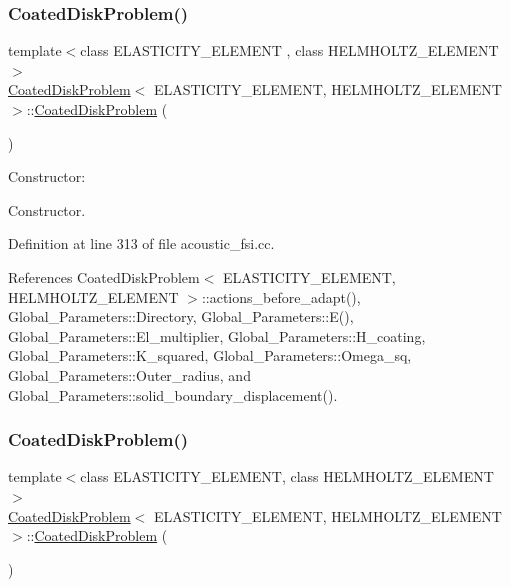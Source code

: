 \subsubsection{\texorpdfstring{Coated\+Disk\+Problem()}{CoatedDiskProblem()}\hspace{0.1cm}{\footnotesize\ttfamily [1/2]}}
{\footnotesize\ttfamily template$<$class E\+L\+A\+S\+T\+I\+C\+I\+T\+Y\+\_\+\+E\+L\+E\+M\+E\+NT , class H\+E\+L\+M\+H\+O\+L\+T\+Z\+\_\+\+E\+L\+E\+M\+E\+NT $>$ \\
\hyperlink{classCoatedDiskProblem}{Coated\+Disk\+Problem}$<$ E\+L\+A\+S\+T\+I\+C\+I\+T\+Y\+\_\+\+E\+L\+E\+M\+E\+NT, H\+E\+L\+M\+H\+O\+L\+T\+Z\+\_\+\+E\+L\+E\+M\+E\+NT $>$\+::\hyperlink{classCoatedDiskProblem}{Coated\+Disk\+Problem} (\begin{DoxyParamCaption}{ }\end{DoxyParamCaption})}



Constructor\+: 

Constructor. 

Definition at line 313 of file acoustic\+\_\+fsi.\+cc.



References Coated\+Disk\+Problem$<$ E\+L\+A\+S\+T\+I\+C\+I\+T\+Y\+\_\+\+E\+L\+E\+M\+E\+N\+T, H\+E\+L\+M\+H\+O\+L\+T\+Z\+\_\+\+E\+L\+E\+M\+E\+N\+T $>$\+::actions\+\_\+before\+\_\+adapt(), Global\+\_\+\+Parameters\+::\+Directory, Global\+\_\+\+Parameters\+::\+E(), Global\+\_\+\+Parameters\+::\+El\+\_\+multiplier, Global\+\_\+\+Parameters\+::\+H\+\_\+coating, Global\+\_\+\+Parameters\+::\+K\+\_\+squared, Global\+\_\+\+Parameters\+::\+Omega\+\_\+sq, Global\+\_\+\+Parameters\+::\+Outer\+\_\+radius, and Global\+\_\+\+Parameters\+::solid\+\_\+boundary\+\_\+displacement().

\mbox{\label{classCoatedDiskProblem_a9585ca5b422c72dc2b91cbb3e311b736}} 
\subsubsection{\texorpdfstring{Coated\+Disk\+Problem()}{CoatedDiskProblem()}\hspace{0.1cm}{\footnotesize\ttfamily [2/2]}}
{\footnotesize\ttfamily template$<$class E\+L\+A\+S\+T\+I\+C\+I\+T\+Y\+\_\+\+E\+L\+E\+M\+E\+NT, class H\+E\+L\+M\+H\+O\+L\+T\+Z\+\_\+\+E\+L\+E\+M\+E\+NT$>$ \\
\hyperlink{classCoatedDiskProblem}{Coated\+Disk\+Problem}$<$ E\+L\+A\+S\+T\+I\+C\+I\+T\+Y\+\_\+\+E\+L\+E\+M\+E\+NT, H\+E\+L\+M\+H\+O\+L\+T\+Z\+\_\+\+E\+L\+E\+M\+E\+NT $>$\+::\hyperlink{classCoatedDiskProblem}{Coated\+Disk\+Problem} (\begin{DoxyParamCaption}{ }\end{DoxyParamCaption})}



